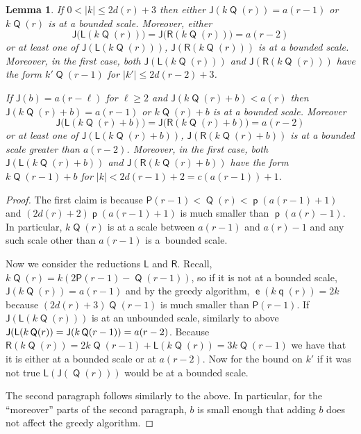 \documentclass[10pt]{amsart}
\newtheorem{lemm}[theo]{Lemma}\newtheorem{prop}[theo]{Proposition}\newtheorem{coro}[theo]{Corollary}\newtheorem{conj}[theo]{Conjecture}
\theoremstyle{definition}\newtheorem{defi}[theo]{Definition}\newtheorem{rema}[theo]{Remark}\newtheorem{exam}[theo]{Example}\newtheorem{exem}[theo]{Example}\newtheorem{nota}[theo]{Notation}
\DeclareMathOperator{\lst}{\mathsf{e}}
\DeclareMathOperator{\p}{\mathsf{p}}
\DeclareMathOperator{\q}{\mathsf{q}}
\DeclareMathOperator{\Q}{\mathsf{Q}}
\newcommand{\lft}{\mathsf{L}}
\newcommand{\rht}{\mathsf{R}}
\renewcommand{\P}{\mathsf{P}}
\newcommand{\scl}{\mathsf{J}}
\begin{document}
\begin{lemm}\label{lem:for pairing}
If $0<|k|\leq 2d(r)+3$ then either $\scl(k\Q(r))=a(r-1)$ or $k\Q(r)$ is at a bounded scale. Moreover, either
\[
\scl \bigl(\lft(k\Q(r))\bigr) =
\scl \bigl(\rht(k\Q(r))\bigr) = a(r-2)
\]
or at least one of $\scl(\lft(k\Q(r)))$, $\scl(\rht(k\Q(r)))$ is at a bounded scale. Moreover, in the first case, both $\scl(\lft(k\Q(r)))$ and $\scl(\rht(k\Q(r)))$ have the form $k'\Q(r-1)$ for $|k'|\leq 2d(r-2)+3$.

If $\scl(b)=a(r-\ell)$ for $\ell \geq 2$ and $\scl(k \Q(r)+b)<a(r)$ then $\scl(k\Q(r)+b)=a(r-1)$ or $k \Q(r)+b$ is at a bounded scale. Moreover
\[
\scl\bigl(\lft(k\Q(r)+b)\bigr) = \scl\bigl(\rht(k\Q(r)+b)\bigr) = a(r-2)
\]
or at least one of $\scl(\lft(k\Q(r)+b))$, $\scl(\rht(k\Q(r)+b))$ is at a bounded scale greater than $a(r-2)$. Moreover, in the first case, both $\scl(\lft(k\Q(r)+b))$ and $\scl(\rht(k\Q(r)+b))$ have the form $k\Q(r-1)+b$ for $|k|<2d(r-1)+2=c(a(r-1))+1$.
\end{lemm}
\begin{proof}
The first claim is because $\P(r-1)<\Q(r)< \p(a(r-1)+1)$ and $(2d(r)+2)\p(a(r-1)+1)$ is much smaller than $\p(a(r)-1)$. In particular, $k\Q(r)$ is at a scale between $a(r-1)$ and $a(r)-1$ and any such scale other than $a(r-1)$ is a~bounded scale.

Now we consider the reductions $\lft$ and $\rht$. Recall, $k\Q(r)=k(2\P(r-1)-\Q(r-1))$, so if it is not at a bounded scale, $\scl(k\Q(r))=a(r-1)$ and by the greedy algorithm, $\lst(k\q(r))=2k$ because $(2d(r)+3)\Q(r-1)$ is much smaller than $\P(r-1)$. If $\scl(\lft(k\Q(r)))$ is at an unbounded scale, similarly to above $\scl(\lft(k\Q(r)) = \scl(k\Q(r-1))\linebreak = a(r-2)$. Because $\rht(k\Q(r))=2k\Q(r-1)+\lft(k\Q(r))=3k\Q(r-1)$ we have that it is either at a bounded scale or at $a(r-2)$. Now for the bound on $k'$ if it was not true $\lft(\scl(\Q(r)))$ would be at a bounded scale.

The second paragraph follows similarly to the above. In particular, for the ``moreover'' parts of the second paragraph, $b$ is small enough that adding $b$ does not affect the greedy algorithm.
\end{proof}
\end{document}

